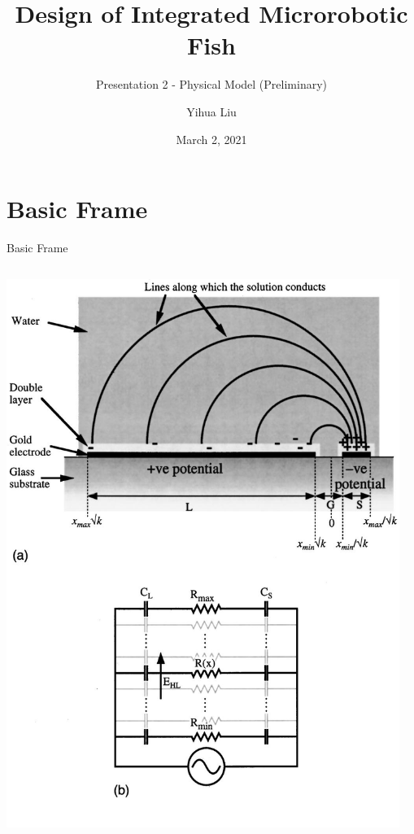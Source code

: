 \documentclass[12pt]{beamer}
\begin{document}
\title{Design of Integrated Microrobotic Fish}
\subtitle{Presentation 2 - Physical Model (Preliminary)}
\author{Yihua Liu}
\date{March 2, 2021}
\begin{frame}
    \titlepage
\end{frame}
\section{Basic Frame}
\begin{frame}{Basic Frame}
    \begin{columns}[onlytextwidth]
        \begin{column}{0.4\textwidth}
            \includegraphics[width=\columnwidth]{1.jpg}
        \end{column}
        \begin{column}{0.6\textwidth}
            \begin{itemize}

\end{itemize}
\end{column}
\end{columns}
\end{frame}
\end{document}
